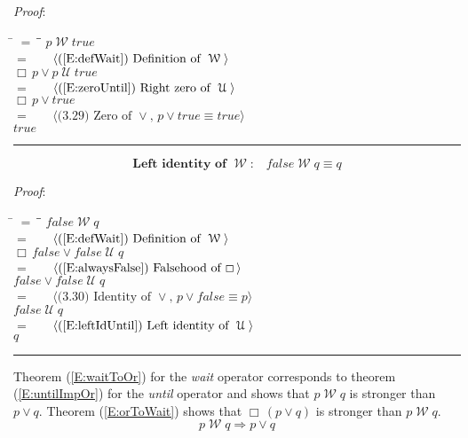 \documentclass[12pt, fleqn, leqno]{article}
\newcommand{\lgap}{2pt}                             %
\newcommand{\mymathindent}{24pt}                    %
\newcommand{\impl}{\ensuremath{\Rightarrow}}        %
\newcommand{\Until}{\;\mathcal{U}\;}
\newcommand{\Wait}{\;\mathcal{W}\;}
\newcommand{\Always}{\Box\,}
\newcommand{\myqed}{\rule[-.23ex]{1.2ex}{2.0ex}}
\newcommand{\myqedtab}{\hspace{384pt}}              %
\newcommand{\Gll} {\langle}                         %
\newcommand{\Ggg} {\rangle}                         %
\newcommand{\Hint}[1]     {\ \ \ $\Gll              \mbox{#1} \Ggg$ }   %
\begin{document}
\emph{Proof}:
\begin{tabbing}
\hspace{\mymathindent} \= $= \;$ \= \myqedtab \= \kill
\> \> $p \Wait true$\\[\lgap]
\> $=$ \> \Hint{(\ref{E:defWait}) Definition of $\Wait$} \\[\lgap]
\> \> $\Always p \lor p\Until true$\\[\lgap]
\> $=$ \> \Hint{(\ref{E:zeroUntil}) Right zero of $\Until$} \\[\lgap]
\> \> $\Always p \lor true$\\[\lgap]
\> $=$ \> \Hint{(3.29) Zero of $\lor$, $p\lor true\equiv true$}\\[\lgap]
\> \> $true$ \quad \myqed
\end{tabbing}
\begin{equation}\label{E:leftIdentWait}
\textbf{Left identity of $\Wait$:}\quad false \Wait q \equiv q
\end{equation}

\emph{Proof}:
\begin{tabbing}
\hspace{\mymathindent} \= $= \;$ \= \myqedtab \= \kill
\> \> $false \Wait q$\\[\lgap]
\> $=$ \> \Hint{(\ref{E:defWait}) Definition of $\Wait$} \\[\lgap]
\> \> $\Always false \lor false\Until q$\\[\lgap]
\> $=$ \> \Hint{(\ref{E:alwaysFalse}) Falsehood of $\Always$} \\[\lgap]
\> \> $false \lor false\Until q$\\[\lgap]
\> $=$ \> \Hint{(3.30) Identity of $\lor$, $p\lor false\equiv p$} \\[\lgap]
\> \> $false\Until q$\\[\lgap]
\> $=$ \> \Hint{(\ref{E:leftIdUntil}) Left identity of $\Until$}\\[\lgap]
\> \> $q$ \quad \myqed
\end{tabbing}

Theorem (\ref{E:waitToOr}) for the \textit{wait} operator corresponds to theorem (\ref{E:untilImpOr}) for the \textit{until} operator and shows that $p \Wait q$ is stronger than $p \lor q$.
Theorem (\ref{E:orToWait}) shows that $\Always(p \lor q)$ is stronger than $p \Wait q$.
\begin{equation}\label{E:waitToOr}
p \Wait q \impl p \lor q
\end{equation}
\end{document}
